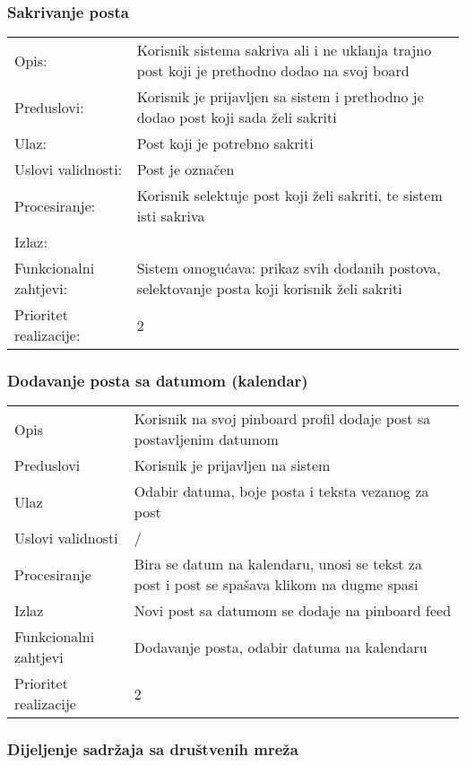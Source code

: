 \subsubsection{Sakrivanje posta}

\begin{tabu} to 1.2
Opis: & Korisnik sistema sakriva ali i ne uklanja trajno post koji je prethodno dodao na svoj board\\
Preduslovi: & Korisnik je prijavljen sa sistem i prethodno je dodao post koji sada želi sakriti \\
Ulaz: & Post koji je potrebno sakriti \\
Uslovi validnosti: & Post je označen \\
Procesiranje: & Korisnik selektuje post koji želi sakriti, te sistem isti sakriva \\
Izlaz: & \\
Funkcionalni zahtjevi: & Sistem omogućava: prikaz svih dodanih postova, selektovanje posta koji korisnik želi sakriti \\
Prioritet realizacije: & 2

\end{tabu}
\newpage
\subsubsection{Dodavanje posta sa datumom (kalendar)}

\begin{tabu} to 1.2
Opis & Korisnik na svoj pinboard profil dodaje post sa postavljenim datumom \\
Preduslovi & Korisnik je prijavljen na sistem \\
Ulaz & Odabir datuma, boje posta i teksta vezanog za post  \\
Uslovi validnosti & / \\
Procesiranje & Bira se datum na kalendaru, unosi se tekst za post i post se spašava klikom na dugme spasi\\
Izlaz & Novi post sa datumom se dodaje na pinboard feed \\
Funkcionalni zahtjevi & Dodavanje posta, odabir datuma na kalendaru \\
Prioritet realizacije & 2 \\
\end{tabu}
\newpage
\subsubsection{Dijeljenje sadržaja sa društvenih mreža}


